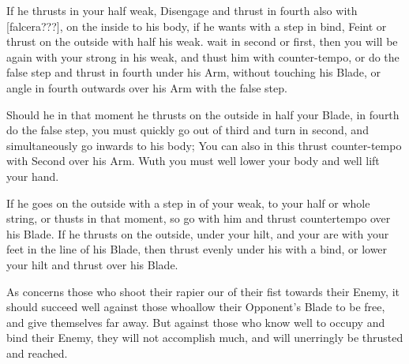 If he thrusts in your half weak, Disengage and thrust in fourth also
with [falcera???], on the inside to his body, if he wants
with a step in bind, Feint or thrust on the outside with half his
weak. wait in second or first, then you will be again with your strong
in his weak, and thust him with counter-tempo, or do the false
step
and thrust in fourth under his Arm, without touching his Blade, or
angle in fourth outwards over his Arm with the false step.


Should he in that moment he thrusts on the outside in half your Blade,
in fourth do the false step, you must quickly go out of third and
turn in second, and simultaneously go inwards to his body; You can
also in this thrust counter-tempo with Second over his Arm. Wuth you
must well lower your body and well lift your hand.


If he goes on the outside with a step in of your weak, to your half or
whole string, or thusts in that moment, so go with him and thrust
countertempo over his Blade. If he thrusts on the outside, under your
hilt, and your are with your feet in the line of his Blade, then
thrust evenly under his with a bind, or lower your hilt and thrust
over his Blade.


As concerns those who shoot their rapier our of their fist towards
their Enemy, it should succeed well against those whoallow their
Opponent's Blade to be free, and give themselves far away. But against
those who know well to occupy and bind their Enemy, they will not
accomplish much, and will unerringly be thrusted and reached.

